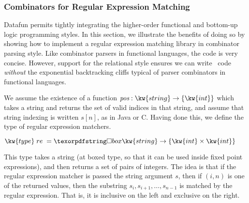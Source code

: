 \subsubsection{Combinators for Regular Expression Matching}

Datafun permits tightly integrating the higher-order functional and
bottom-up logic programming styles. In this section, we illustrate the
benefits of doing so by showing how to implement a regular expression
matching library in combinator parsing style.  Like combinator parsers
in functional languages, the code is very concise.  However, support
for the relational style ensures we can write \naive\ code
\emph{without} the exponential backtracking cliffs typical of parser
combinators in functional languages.

We assume the existence of a function
$\name{pos} : \kw{string} \to \tset{\kw{int}}$ which takes a string
and returns the set of valid indices in that string, and assume
that string indexing is written $s[n]$, as in Java or C. Having done this, we define
the type of regular expression matchers.
\begin{tabbing} 
\qquad  $\kw{type}\;re\;=\iso \kw{string} \to \tset{\kw{int} \times \kw{int}}$  
\end{tabbing}
This type takes a string (at boxed type, so that it can be used inside
fixed point expressions), and then returns a set of pairs of integers. The
idea is that if the regular expression matcher is passed the string
argument $s$, then if $(i, n)$ is one of the returned values, then the
substring $s_i, s_{i+1}, \ldots, s_{n-1}$ is matched by the regular expression.
That is, it is inclusive on the left and exclusive on the right. 

